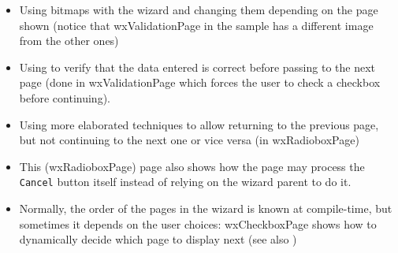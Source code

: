 \begin{itemize}\itemsep=0pt
\item Using bitmaps with the wizard and changing them depending on the page
shown (notice that wxValidationPage in the sample has a different image from
the other ones)
\item Using 
to verify that the data entered is correct before passing to the next page
(done in wxValidationPage which forces the user to check a checkbox before
continuing).
\item Using more elaborated techniques to allow returning to the previous
page, but not continuing to the next one or vice versa (in wxRadioboxPage)
\item This (wxRadioboxPage) page also shows how the page may process the {\tt
Cancel} button itself instead of relying on the wizard parent to do it.
\item Normally, the order of the pages in the wizard is known at compile-time,
but sometimes it depends on the user choices: wxCheckboxPage shows how to
dynamically decide which page to display next (see also
)
\end{itemize}


